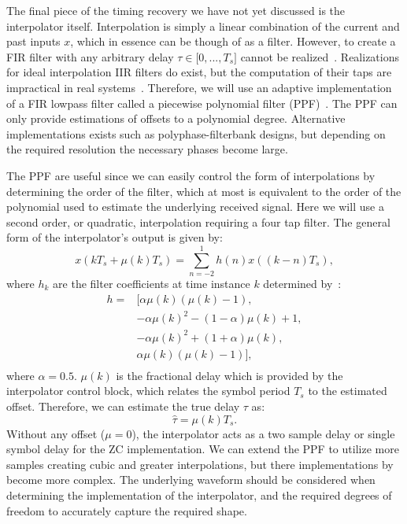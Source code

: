 \documentclass[letterpaper,12pt]{article}
\begin{document}
The final piece of the timing recovery we have not yet discussed is the interpolator itself.  Interpolation is simply a linear combination of the current and past inputs $x$, which in essence can be though of as a filter.  However, to create a FIR filter with any arbitrary delay $\tau \in \big[0,...,T_s\big]$ cannot be realized~\cite{unitDelay}.  Realizations for ideal interpolation IIR filters do exist, but the computation of their taps are impractical in real systems~\cite{Thiran1971}.  Therefore, we will use an adaptive implementation of a FIR lowpass filter called a piecewise polynomial filter (PPF)~\cite{rice2009}.  The PPF can only provide estimations of offsets to a polynomial degree.  Alternative implementations exists such as polyphase-filterbank designs, but depending on the required resolution the necessary phases become large.\par
%
The PPF are useful since we can easily control the form of interpolations by determining the order of the filter, which at most is equivalent to the order of the polynomial used to estimate the underlying received signal.  Here we will use a second order, or quadratic, interpolation requiring a four tap filter.  The general form of the interpolator's output is given by:
%
\begin{equation}\label{eq:ppf_eq}
 x(kT_s + \mu(k)T_s) = \sum_{n=-2}^{1} h(n) x((k-n)T_s),
\end{equation}
%
where $h_k$ are the filter coefficients at time instance $k$ determined by~\cite{harris1993}:
%
\begin{equation}
\begin{split}
 h = &[\alpha\mu(k)(\mu(k)-1),\\
 &-\alpha\mu(k)^2-(1-\alpha)\mu(k) + 1,\\
 &-\alpha\mu(k)^2+(1+\alpha)\mu(k) ,\\
 &\alpha\mu(k)(\mu(k)-1)],\\
\end{split}
\end{equation}
%
where $\alpha=0.5$. $\mu(k)$ is the fractional delay which is provided by the interpolator control block, which relates the symbol period $T_s$ to the estimated offset.  Therefore, we can estimate the true delay $\tau$ as:
%
\begin{equation}
	\hat{\tau} = \mu(k)T_s.
\end{equation}
%
Without any offset ($\mu=0$), the interpolator acts as a two sample delay or single symbol delay for the ZC implementation.  We can extend the PPF to utilize more samples creating cubic and greater interpolations, but there implementations by become more complex.  The underlying waveform should be considered when determining the implementation of the interpolator, and the required degrees of freedom to accurately capture the required shape.\par
\end{document}
